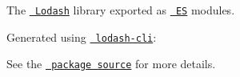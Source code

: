 The \href{https://lodash.com/}{\texttt{ Lodash}} library exported as \href{http://www.ecma-international.org/ecma-262/6.0/}{\texttt{ ES}} modules.

Generated using \href{https://www.npmjs.com/package/lodash-cli}{\texttt{ lodash-\/cli}}\+: 
\begin{DoxyCode}{0}

\end{DoxyCode}


See the \href{https://github.com/lodash/lodash/tree/4.17.21-es}{\texttt{ package source}} for more details. 